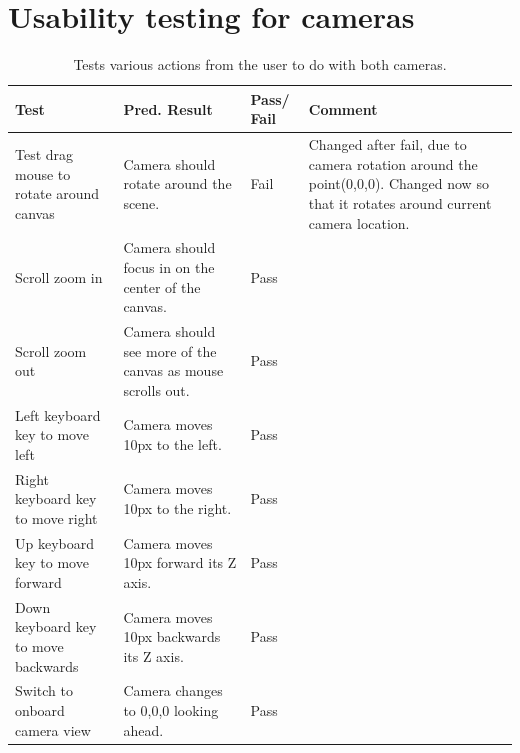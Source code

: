 \clearpage

\section{Usability testing for cameras}
\label{test:cameras}
\begin{table}[h]
\begin{tabular}{|p{4.5cm}|p{4.5cm}|p{1cm}|p{4cm}|}
\hline
\textbf{Test} & \textbf{Pred. Result} & \textbf{Pass/ Fail} & \textbf{Comment}                        \\ \hline
Test drag mouse to rotate around canvas    &  Camera should rotate around the scene.  &     Fail       &  Changed after fail, due to camera rotation around the point(0,0,0). Changed now so that it rotates around current camera location.    \\ \hline
Scroll zoom in    &   Camera should focus in on the center of the canvas. &   Pass         &    \\ \hline
Scroll zoom out    &   Camera should see more of the canvas as mouse scrolls out. & Pass           &     \\ \hline
Left keyboard key to move left    &  Camera moves 10px to the left.  &   Pass         &     \\ \hline
Right keyboard key to move right    & Camera moves 10px to the right.   &    Pass        &     \\ \hline
Up keyboard key to move forward    &  Camera moves 10px forward its Z axis.  &   Pass         &     \\ \hline
Down keyboard key to move backwards    &  Camera moves 10px backwards its Z axis.  &  Pass          &     \\ \hline
Switch to onboard camera view   &  Camera changes to 0,0,0 looking ahead. &  Pass          &     \\ \hline
\end{tabular}
\caption{Tests various actions from the user to do with both cameras.}
\end{table}

\clearpage

